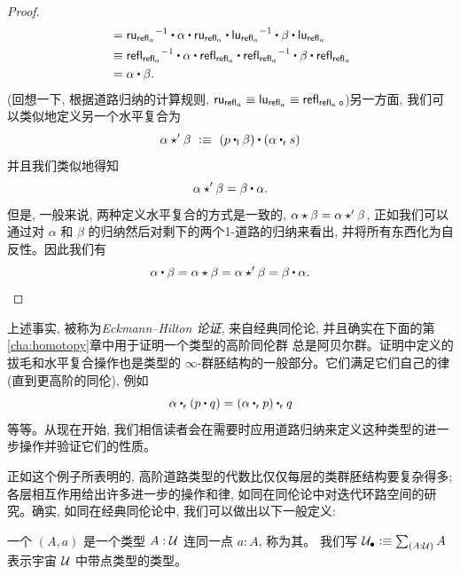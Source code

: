\begin{proof}
\begin{align*}
  &= \opp{\mathsf{ru}_{\refl{a}}} \ct \alpha \ct \mathsf{ru}_{\refl{a}} \ct \opp{\mathsf{lu}_{\refl a}} \ct \beta \ct \mathsf{lu}_{\refl{a}}\\
  &\jdeq \opp{\refl{\refl{a}}} \ct \alpha \ct \refl{\refl{a}} \ct \opp{\refl{\refl a}} \ct \beta \ct \refl{\refl{a}}\\
  &= \alpha \ct \beta.
\end{align*}
(回想一下, 根据道路归纳的计算规则, $\mathsf{ru}_{\mathsf{refl}_{a}} \equiv \mathsf{lu}_{\mathsf{refl}_{a}} \equiv \mathsf{refl}_{\mathsf{refl}_{a}}$。)另一方面, 我们可以类似地定义另一个水平复合为
\[
\alpha\hct'\beta\ \defeq\ (p\leftwhisker \beta)\ct (\alpha\rightwhisker s)
\]
并且我们类似地得知
\[
\alpha\hct'\beta = \beta\ct\alpha.
\]
%
但是, 一般来说, 两种定义水平复合的方式是一致的, $\alpha\star\beta = \alpha\star'\beta$, 正如我们可以通过对 $\alpha$ 和 $\beta$ 的归纳然后对剩下的两个1-道路的归纳来看出, 
并将所有东西化为自反性。因此我们有
\[\alpha \ct \beta = \alpha\hct\beta = \alpha\hct'\beta = \beta\ct\alpha.
\qedhere
\]
\end{proof}

上述事实, 被称为\emph{Eckmann--Hilton 论证}, 来自经典同伦论, 并且确实在下面的第\ref{cha:homotopy}章中用于证明一个类型的高阶同伦群
总是阿贝尔群。证明中定义的拔毛和水平复合操作也是类型的 $\infty$-群胚结构的一般部分。它们满足它们自己的律(直到更高阶的同伦), 例如
\[ \alpha \rightwhisker (p\ct q) = (\alpha \rightwhisker p) \rightwhisker q \]
等等。从现在开始, 我们相信读者会在需要时应用道路归纳来定义这种类型的进一步操作并验证它们的性质。

正如这个例子所表明的, 高阶道路类型的代数比仅仅每层的类群胚结构要复杂得多; 各层相互作用给出许多进一步的操作和律, 
如同在同伦论中对迭代环路空间的研究。确实, 如同在经典同伦论中, 我们可以做出以下一般定义:

\begin{defn} \label{def:pointedtype}
  一个
  $(A,a)$ 是一个类型 $A:\mathcal{U}$ 连同一点 $a:A$, 称为其。
  我们写 $\pointed{\type} \defeq \sm{A:\type} A$ 表示宇宙 $\mathcal{U}$ 中带点类型的类型。
\end{defn}

